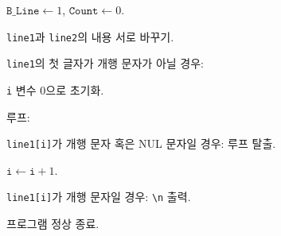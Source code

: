 \begin{algorithm}
\begin{algorithm}
\begin{algorithm}
						\item $\texttt{B_Line} \leftarrow 1$, $\texttt{Count} \leftarrow 0$.
					\end{algorithm}
				\item \texttt{line1}과 \texttt{line2}의 내용 서로 바꾸기.
			\end{algorithm}
	\item \texttt{line1}의 첫 글자가 개행 문자가 아닐 경우:
			\begin{algorithm}
				\item \texttt{i} 변수 0으로 초기화.
				\item 루프:
					\begin{algorithm}
						\item \texttt{line1[i]}가 개행 문자 혹은 NUL 문자일 경우: 루프 탈출.
						\item $\texttt{i} \leftarrow \texttt{i} + 1$.
					\end{algorithm}
				\item \texttt{line1[i]}가 개행 문자일 경우: \texttt{\textbackslash{}n} 출력.
			\end{algorithm}
	\item 프로그램 정상 종료.
\end{algorithm}

